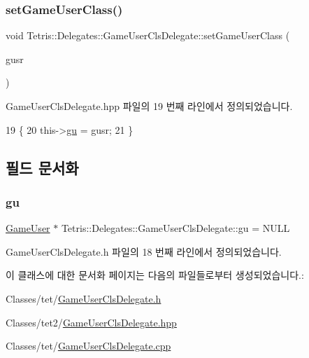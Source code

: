 \subsubsection{\texorpdfstring{set\+Game\+User\+Class()}{setGameUserClass()}\hspace{0.1cm}{\footnotesize\ttfamily [2/2]}}
{\footnotesize\ttfamily void Tetris\+::\+Delegates\+::\+Game\+User\+Cls\+Delegate\+::set\+Game\+User\+Class (\begin{DoxyParamCaption}\item[{\hyperlink{class_tetris_1_1_users_1_1_game_user}{Game\+User} $\ast$}]{gusr }\end{DoxyParamCaption})\hspace{0.3cm}{\ttfamily [inline]}}



Game\+User\+Cls\+Delegate.\+hpp 파일의 19 번째 라인에서 정의되었습니다.


\begin{DoxyCode}
19                                                          \{
20                         this->\hyperlink{class_tetris_1_1_delegates_1_1_game_user_cls_delegate_affeaedfa26fa58ee383fff43692f6709}{gu} = gusr;
21                     \}
\end{DoxyCode}


\subsection{필드 문서화}
\mbox{\label{class_tetris_1_1_delegates_1_1_game_user_cls_delegate_affeaedfa26fa58ee383fff43692f6709}} 
\subsubsection{\texorpdfstring{gu}{gu}}
{\footnotesize\ttfamily \hyperlink{class_tetris_1_1_users_1_1_game_user}{Game\+User} $\ast$ Tetris\+::\+Delegates\+::\+Game\+User\+Cls\+Delegate\+::gu = N\+U\+LL\hspace{0.3cm}{\ttfamily [protected]}}



Game\+User\+Cls\+Delegate.\+h 파일의 18 번째 라인에서 정의되었습니다.



이 클래스에 대한 문서화 페이지는 다음의 파일들로부터 생성되었습니다.\+:\begin{DoxyCompactItemize}
\item 
Classes/tet/\hyperlink{_game_user_cls_delegate_8h}{Game\+User\+Cls\+Delegate.\+h}\item 
Classes/tet2/\hyperlink{_game_user_cls_delegate_8hpp}{Game\+User\+Cls\+Delegate.\+hpp}\item 
Classes/tet/\hyperlink{_game_user_cls_delegate_8cpp}{Game\+User\+Cls\+Delegate.\+cpp}\end{DoxyCompactItemize}
